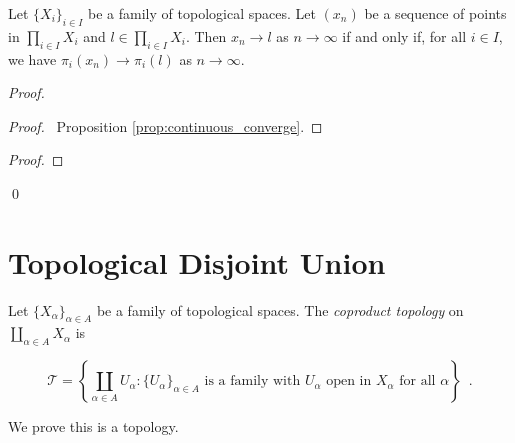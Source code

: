 \begin{prop}
Let $\{X_i\}_{i \in I}$ be a family of topological spaces. Let $(x_n)$ be a sequence of points in $\prod_{i \in I} X_i$ and $l \in \prod_{i \in I} X_i$. Then $x_n \rightarrow l$ as $n \rightarrow \infty$ if and only if, for all $i \in I$, we have $\pi_i(x_n) \rightarrow \pi_i(l)$ as $n \rightarrow \infty$.
\end{prop}

\begin{proof}
\pf
{}
\begin{proof}
	\pf\ Proposition \ref{prop:continuous_converge}.
\end{proof}
\begin{proof}
\end{proof}
\qed
\end{proof}

\section{Topological Disjoint Union}

\begin{df}
Let $\{ X_\alpha \}_{\alpha \in A}$ be a family of topological spaces. The \emph{coproduct topology} on $\coprod_{\alpha \in A} X_\alpha$ is 

\[ \mathcal{T} = \left\{ \coprod_{\alpha \in A} U_\alpha : \{ U_\alpha \}_{\alpha \in A} \text{ is a family with $U_\alpha$ open in $X_\alpha$ for all $\alpha$} \right\} \enspace . \]

We prove this is a topology.
\end{df}

